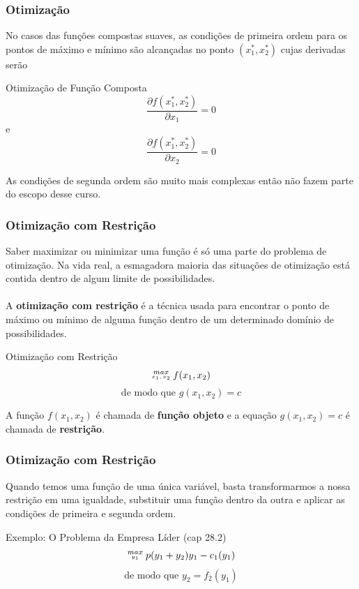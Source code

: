 \documentclass{beamer}[10]
\begin{document}
\begin{frame}
	\frametitle{Otimização}

	No casos das funções compostas suaves, as condições de primeira ordem para os pontos de máximo e mínimo são alcançadas no ponto $(x_{1}^*,x_{2}^*)$ cujas derivadas serão

	\begin{block}{Otimização de Função Composta}
		$$ \frac{\partial f(x_{1}^*,x_{2}^*)}{\partial x_1} = 0 $$
		e
		$$ \frac{\partial f(x_{1}^*,x_{2}^*)}{\partial x_2} = 0 $$
	\end{block}

	As condições de segunda ordem são muito mais complexas então não fazem parte do escopo desse curso.
\end{frame}

\begin{frame}
	\frametitle{Otimização com Restrição}

	Saber maximizar ou minimizar uma função é só uma parte do problema de otimização. Na vida real, a esmagadora maioria das situações de otimização está contida dentro de algum limite de possibilidades.
	\\~\\
	A \textbf{otimização com restrição} é a técnica usada para encontrar o ponto de máximo ou mínimo de alguma função dentro de um determinado domínio de possibilidades.

	\begin{block}{Otimização com Restrição}
		$$ \huge \stackrel{max}{\textrm{\tiny $x_1,x_2$}} \normalsize f(x_1,x_2) $$
		\normalsize $$ \textrm{de modo que } g(x_1,x_2) = c $$
	\end{block}

	A função $f(x_1,x_2)$ é chamada de \textbf{função objeto} e a equação $g(x_1,x_2) = c$ é chamada de \textbf{restrição}.
\end{frame}

\begin{frame}
	\frametitle{Otimização com Restrição}

	Quando temos uma função de uma única variável, basta transformarmos a nossa restrição em uma igualdade, substituir uma função dentro da outra e aplicar as condições de primeira e segunda ordem.

	\begin{block}{Exemplo: O Problema da Empresa Líder (cap 28.2)}
		$$ \huge \stackrel{max}{\textrm{\tiny $y_1$}} \normalsize p(y_1 + y_2)y_1 - c_1(y_1) $$
		\normalsize $$ \textrm{de modo que } y_2 = f_2(y_1) $$
	\end{block}
\end{frame}
\end{document}
